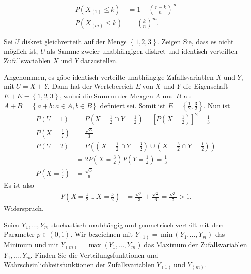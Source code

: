 \solution
\begin{align*}
    P\left( X_{(1)} \leq k \right) &= 1 - \left( \frac{n-k}{n} \right)^m \\
    P\left( X_{(m)} \leq k \right) &= \left( \frac{k}{n} \right)^{m}. 
\end{align*}


 Sei $U$ diskret
gleichverteilt auf der Menge $\left\{ 1, 2, 3 \right\}$. Zeigen Sie, dass es
nicht möglich ist, $U$ als Summe zweier unabhängigen diskret und identisch
verteilten Zufallsvariablen $X$ und $Y$ darzustellen.

\solution Angenommen, es gäbe identisch verteilte unabhängige Zufallsvariablen
$X$ und $Y$, mit $U = X + Y$. Dann hat der Wertebereich $E$ von $X$ und $Y$
die Eigenschaft $E+E = \left\{ 1,2,3 \right\}$, wobei die Summe der Mengen $A$ und $B$
als $A+B = \left\{ a+b : a\in A, b\in B \right\}$ definiert sei. Somit ist
$E = \left\{ \frac{1}{2}, \frac{3}{2} \right\}$. Nun ist
\begin{align*}
    P(U = 1) &= P\left( X = \frac{1}{2} \cap  Y = \frac{1}{2} \right) = \left[ P\left( X=\frac{1}{2} \right) \right]^{2} = \frac{1}{3} \\
    P\left( X= \frac{1}{2} \right) &= \frac{ \sqrt{3} }{3}. \\
    P(U = 2) &= P\left( \left( X=\frac{1}{2} \cap Y=\frac{3}{2} \right) \cup \left( X=\frac{3}{2} \cap Y=\frac{1}{2} \right) \right) \\
    &= 2 P\left( X=\frac{3}{2} \right) P\left( Y=\frac{1}{2} \right) = \frac{1}{3}. \\
    P\left( X=\frac{3}{2}  \right) &= \frac{ \sqrt{3} }{6}.
\end{align*}
Es ist also
\begin{align*}
    P(X=\frac{1}{2} \cup X=\frac{3}{2}) &= \frac{ \sqrt{3}}{3} + \frac{\sqrt{3}}{6} = \frac{\sqrt{3}}{2} > 1.
\end{align*}
Widerspruch.


 Seien $Y_1,\dots ,Y_m$
stochastisch unabhängig und geometrisch verteilt mit dem Parameter $p\in(0,1)$.
Wir bezeichnen mit $Y_{(1)} = \min (Y_1,\dots ,Y_m)$ das Minimum und mit
$Y_{(m)} = \max \left( Y_1,\dots ,Y_m \right)$ das Maximum der Zufallsvariablen
$Y_1,\dots ,Y_m$.  Finden Sie die Verteilungsfunktionen und Wahrscheinlichkeitsfunktionen der
Zufallsvariablen $Y_{(1)}$ und $Y_{(m)}$.

